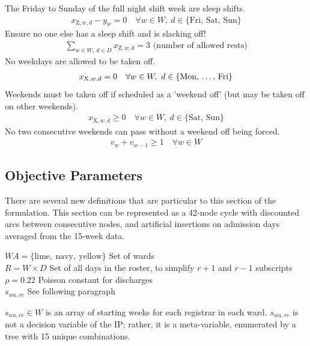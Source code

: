 \documentclass[a4paper]{article}
\begin{document}
The Friday to Sunday of the full night shift week are sleep shifts.
\begin{align}
  x_{\text{Z}, w, d} - y_w = 0 \quad\forall w\in W,\ d\in \{\text{Fri, Sat, Sun}\}
\end{align}
Ensure no one else has a sleep shift and is slacking off!
\begin{align}
  \sum_{w\in W,\ d\in D} x_{\text{Z}, w, d} = 3 \text{ (number of allowed rests)}
\end{align}
No weekdays are allowed to be taken off.
\begin{align}
  x_{\text{X}, w, d} = 0 \quad\forall w\in W,\ d\in \{\text{Mon, \dots, Fri}\}
\end{align}
Weekends must be taken off if scheduled as a 'weekend off' (but may be taken off on other weekends).
\begin{align}
  x_{\text{X}, w, d} \ge 0 \quad\forall w\in W,\ d\in \{\text{Sat, Sun}\}
\end{align}
No two consecutive weekends can pass without a weekend off being forced.
\begin{align}
  v_w + v_{w-1} \ge 1 \quad\forall w\in W
\end{align}

\subsection{Objective Parameters}

There are several new definitions that are particular to this section of the formulation. This section can be represented as a 42-node cycle with discounted arcs between consecutive nodes, and artificial insertions on admission days averaged from the 15-week data.

\begin{multicols}{2}
\begin{flushright}
$WA = \{\text{lime},\ \text{navy},\ \text{yellow}\}$ \dotfill Set of wards\\
$R = W\times D$ \dotfill Set of all days in the roster, to simplify $r+1$ and $r-1$ subscripts\\
$\rho = 0.22$ \dotfill Poisson constant for discharges\\
$s_{wa,re}$ \dotfill See following paragraph
\end{flushright}

$s_{wa, re} \in W$ is an array of starting weeks for each registrar in each ward. $s_{wa, re}$ is not a decision variable of the IP; rather, it is a meta-variable, enumerated by a tree with 15 unique combinations.
\end{multicols}
\end{document}
